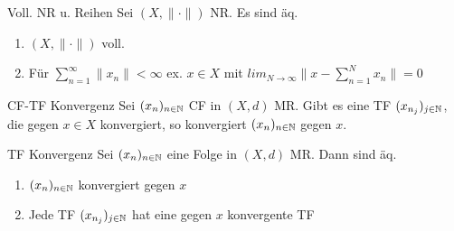\begin{satz}{Voll. NR u. Reihen}
  Sei \((X,\|\cdot\|)\) NR. Es sind äq.
  \begin{enumerate}[label=(\roman*)]
    \item \((X,\|\cdot\|)\) voll.
    \item Für \(\sum_{n=1}^\infty \|x_n\| < \infty\) ex.
      \(x\in X\) mit \(lim_{N\to\infty}\|x-
      \sum_{n=1}^N x_n\| = 0\)
  \end{enumerate}
\end{satz}

\begin{satz}{CF-TF Konvergenz}
  Sei \((x_n)_{n\in \mathbb{N}}\) CF in \((X,d)\) MR. Gibt es eine TF
  \((x_{n_j})_{{j\in \mathbb{N}}}\), die gegen \(x\in X\) konvergiert,
  so konvergiert \((x_n)_{n\in \mathbb{N}}\) gegen \(x\).
\end{satz}

\begin{satz}{TF Konvergenz}
  Sei \((x_n)_{n\in \mathbb{N}}\) eine Folge in \((X,d)\) MR. Dann sind
  äq.
  \begin{enumerate}[label=(\roman*)]
    \item \((x_n)_{n\in \mathbb{N}}\) konvergiert gegen \(x\)
    \item Jede TF \((x_{n_j})_{j\in \mathbb{N}}\) hat eine gegen \(x\)
      konvergente TF
  \end{enumerate}
\end{satz}